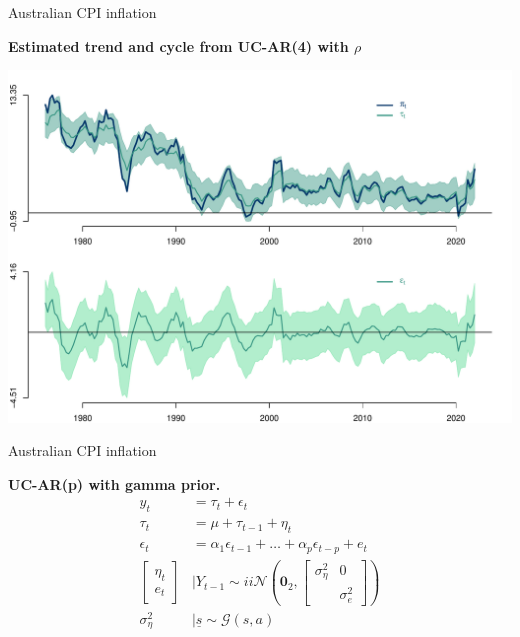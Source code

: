 \documentclass[notes,blackandwhite,mathsans,usenames,dvipsnames]{beamer}
\begin{document}
\begin{frame}{Australian CPI inflation}

\small
\centering
\smallskip\textbf{Estimated trend and cycle from UC-AR(4) with $\rho$}

\includegraphics[scale=0.4, trim=2cm 0.5cm 2cm 0cm]{results/pi-rho-uc-ar4.pdf}

\end{frame}





\begin{frame}{Australian CPI inflation}

\bigskip\textbf{UC-AR(p) with gamma prior.}
\begin{align*}
y_t &= \tau_t + \epsilon_t\\[1ex]
\tau_t &= \mu + \tau_{t-1} + \eta_t\\[1ex]
\epsilon_t &= \alpha_1\epsilon_{t-1} + \dots + \alpha_p\epsilon_{t-p} +  e_t\\[2ex]
\begin{bmatrix}\eta_t \\ e_t\end{bmatrix}&\bigg|Y_{t-1} \sim ii\mathcal{N}\left(\mathbf{0}_2, \begin{bmatrix}\sigma_\eta^2 & 0 \\  & \sigma_e^2\end{bmatrix} \right)\\[2ex]
\sigma_\eta^2 &\mid\underline{s} \sim\mathcal{G}(s,a)
\end{align*}

\end{frame}
\end{document}
